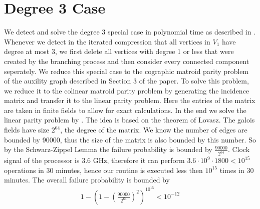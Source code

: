 \documentclass[11pt,a4paper]{scrartcl}
\begin{document}
\section{Degree 3 Case}

We detect and solve the degree 3 special case in polynomial time as described in \cite{DBLP:journals/corr/abs-1004-1672}. Whenever we detect in the iterated compression that all vertices in $V_1$ have degree at most 3, we first delete all vertices with degree 1 or less that were created by the branching process and then consider every connected component seperately. We reduce this special case to the cographic matroid parity problem of the auxility graph described in Section 3 of the paper. To solve this problem, we reduce it to the colinear matroid parity problem by generating the incidence matrix and transfer it to the linear parity problem. Here the entries of the matrix are taken in finite fields to allow for exact calculations. In the end we solve the linear parity problem by \cite{Cheung:2014:AAL:2620785.2601066}. The idea is based on the theorem of Lovasz. The galois fields have size $2^{64}$, the degree of the matrix. We know the number of edges are bounded by 90000, thus the size of the matrix is also bounded by this number. So by the Schwarz-Zippel Lemma the failure probability is bounded by $\frac{90000}{2^{64}}$. Clock signal of the processor is 3.6 GHz, therefore it can perform $3.6\cdot 10^9\cdot 1800<10^{15}$ operations in 30 minutes, hence our routine is executed less then $10^{15}$ times in 30 minutes. The overall failure probability is bounded by
\begin{align*}
1-\left(1-\left(\frac{90000}{2^{64}}\right)^2\right)^{10^{15}}<10^{-12}
\end{align*}

\nocite{bafna1999}
\nocite{chen2008}


\end{document}
